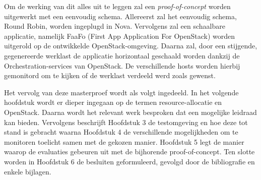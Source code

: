 Om de werking van dit alles uit te leggen zal een \textit{proof-of-concept} worden uitgewerkt met een eenvoudig schema.
Allereerst zal het eenvoudig schema, Round Robin, worden ingeplugd in Nova. Vervolgens zal een schaalbare applicatie, namelijk FaaFo (First App Application For OpenStack) worden uitgerold op de ontwikkelde OpenStack-omgeving. Daarna zal, door een stijgende, gegenereerde werklast de applicatie horizontaal geschaald worden dankzij de Orchestration-services van OpenStack. De verschillende hosts worden hierbij gemonitord om te kijken of de werklast verdeeld werd zoals gewenst.

Het vervolg van deze masterproef wordt als volgt ingedeeld. In het volgende hoofdstuk wordt er dieper ingegaan op de termen resource-allocatie en OpenStack. Daarna wordt het relevant werk besproken dat een mogelijke leidraad kan bieden. Vervolgens beschrijft Hoofdstuk 3 de testomgeving en hoe deze tot stand is gebracht waarna Hoofdstuk 4 de verschillende mogelijkheden om te monitoren toelicht samen met de gekozen manier. Hoofdstuk 5 legt de manier waarop de evaluaties gebeuren uit met de bijhorende proof-of-concept. Ten slotte worden in Hoofdstuk 6 de besluiten geformuleerd, gevolgd door de bibliografie en enkele bijlagen.